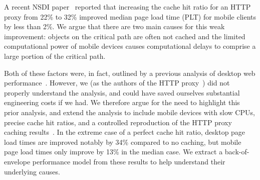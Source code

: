 A recent NSDI paper~\cite{flywheel} reported that
increasing the cache hit ratio for an HTTP proxy from 22\% to 32\% improved
median page load time (PLT) for mobile clients by less than 2\%.
We argue that there are two main causes for this weak improvement:
objects on the critical path are often not cached and the limited computational power of mobile devices causes computational delays to  comprise a large portion of the critical path. %




Both of
these factors were, in fact, outlined by a previous analysis of desktop
web performance~\cite{wang2013demystifying}. However, we (as the authors of the HTTP proxy~\cite{flywheel}) did not properly understand the analysis, and could have saved ourselves substantial engineering costs if we had. We therefore argue for the need to highlight this prior
analysis, and extend the analysis
to include mobile devices with slow CPUs, precise cache hit ratios,
and a controlled reproduction of the
HTTP proxy caching
results~\cite{flywheel}. %
In the extreme case of a perfect cache hit ratio, desktop page load times are
improved notably by 34\% compared to no caching, but mobile page
load times only improve by 13\% in the median case.
We extract a back-of-envelope performance model from these results to
help understand their underlying causes.



